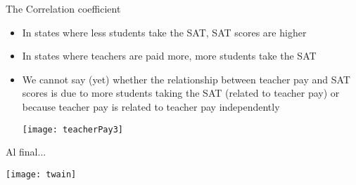 \documentclass[xcolor=dvipsnames]{beamer}
\begin{document}
\begin{frame}{The Correlation coefficient}
	\begin{itemize}
		\item In states where less students take the SAT, SAT scores are higher \pause
		\item In states where teachers are paid more, more students take the SAT \pause
		\item We cannot say (yet) whether the relationship between teacher pay and SAT scores is due to more students taking the SAT (related to teacher pay) or because teacher pay is related to teacher pay independently
		\begin{center}
			\texttt{[image: teacherPay3]}
		\end{center}
	\end{itemize}
\end{frame}

\begin{frame}{Al final...}
	\begin{center}
		\texttt{[image: twain]}
	\end{center}
\end{frame}
              
\end{document}
